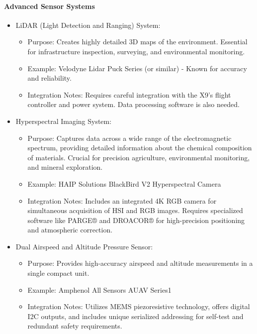 \paragraph{Advanced Sensor Systems}
\begin{itemize}
\item LiDAR (Light Detection and Ranging) System:
\begin{itemize}
\item Purpose: Creates highly detailed 3D maps of the environment. Essential for infrastructure inspection, surveying, and environmental monitoring.
\item Example: Velodyne Lidar Puck Series (or similar) - Known for accuracy and reliability.
\item Integration Notes: Requires careful integration with the X9's flight controller and power system. Data processing software is also needed.
\end{itemize}

\item Hyperspectral Imaging System:
\begin{itemize}
\item Purpose: Captures data across a wide range of the electromagnetic spectrum, providing detailed information about the chemical composition of materials. Crucial for precision agriculture, environmental monitoring, and mineral exploration.
\item Example: HAIP Solutions BlackBird V2 Hyperspectral Camera
\item Integration Notes: Includes an integrated 4K RGB camera for simultaneous acquisition of HSI and RGB images. Requires specialized software like PARGE® and DROACOR® for high-precision positioning and atmospheric correction.
\end{itemize}

\item Dual Airspeed and Altitude Pressure Sensor:
\begin{itemize}
\item Purpose: Provides high-accuracy airspeed and altitude measurements in a single compact unit.
\item Example: Amphenol All Sensors AUAV Series1
\item Integration Notes: Utilizes MEMS piezoresistive technology, offers digital I2C outputs, and includes unique serialized addressing for self-test and redundant safety requirements.
\end{itemize}
\end{itemize}

